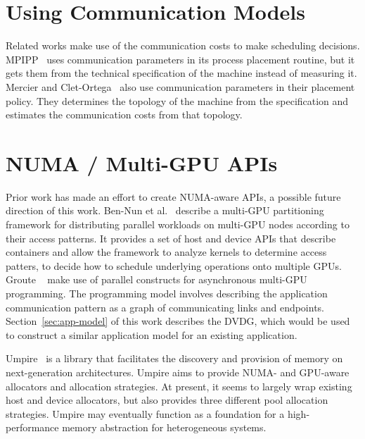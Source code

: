 \section{Using Communication Models}

Related works make use of the communication costs to make scheduling decisions.
MPIPP~\cite{chen2006mpipp} uses communication parameters in its process placement routine, but it gets them from the technical specification of the machine instead of measuring it.
Mercier and Clet-Ortega~\cite{mercier2009towards} also use communication parameters in their placement policy.
They determines the topology of the machine from the specification and estimates the communication costs from that topology.

\section{NUMA / Multi-GPU APIs}

Prior work has made an effort to create NUMA-aware APIs, a possible future direction of this work.
Ben-Nun et al.~\cite{ben2015memory} describe a multi-GPU partitioning framework for distributing parallel workloads on multi-GPU nodes according to their access patterns.
It provides a set of host and device APIs that describe containers and allow the framework to analyze kernels to determine access patters, to decide how to schedule underlying operations onto multiple GPUs.
Groute ~\cite{ben2017groute} make use of parallel constructs for asynchronous multi-GPU programming.
The programming model involves describing the application communication pattern as a graph of communicating links and endpoints.
Section~\ref{sec:app-model} of this work describes the DVDG, which would be used to construct a similar application model for an existing application.

Umpire~\cite{beckingsale2018umpire} is a library that facilitates the discovery and provision of memory on next-generation architectures.
Umpire aims to provide NUMA- and GPU-aware allocators and allocation strategies.
At present, it seems to largely wrap existing host and device allocators, but also provides three different pool allocation strategies.
Umpire may eventually function as a foundation for a high-performance memory abstraction for heterogeneous systems.
